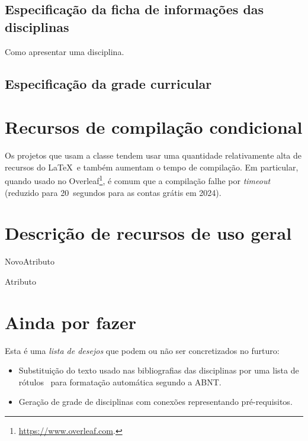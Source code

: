 \documentclass[a4paper, 11pt]{article}
\begin{document}
\subsection{Especificação da ficha de informações das disciplinas}

Como apresentar uma disciplina.

\subsection{Especificação da grade curricular}


\section{Recursos de compilação condicional}
%
%
Os projetos que usam a classe  tendem usar uma quantidade relativamente alta de recursos do \LaTeX\ e também aumentam o tempo de compilação. Em particular, quando usado no Overleaf\footnote{\url{https://www.overleaf.com}.}, é comum que a compilação falhe por \textit{timeout} (reduzido para 20~segundos para as contas grátis em 2024).


\section{Descrição de recursos de uso geral}

\begin{Macrodef}{NovoAtributo}{}{}

\end{Macrodef}

\begin{Macrodef}{Atributo}{}{}

\end{Macrodef}


\section{Ainda por fazer}
Esta é uma \textit{lista de desejos} que podem ou não ser concretizados no furturo:

\begin{itemize}
    \item Substituição do texto usado nas bibliografias das disciplinas por uma lista de rótulos \BibTeX\ para formatação automática segundo a ABNT.
    \item Geração de grade de disciplinas com conexões representando pré-requisitos.
\end{itemize}

\printindex
\end{document}
